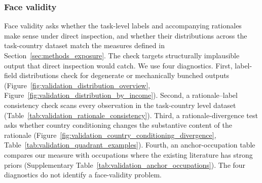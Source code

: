 \documentclass[11pt]{article}
\begin{document}
\subsubsection{Face validity}
\label{sec:validation_face}
Face validity asks whether the task-level labels and accompanying rationales make sense under direct inspection, and whether their distributions across the task-country dataset match the measures defined in Section~\ref{sec:methods_exposure}. The check targets structurally implausible output that direct inspection would catch. We use four diagnostics. First, label-field distributions check for degenerate or mechanically bunched outputs (Figure~\ref{fig:validation_distribution_overview}, Figure~\ref{fig:validation_distribution_by_income}). Second, a rationale--label consistency check scans every observation in the task-country level dataset (Table~\ref{tab:validation_rationale_consistency}). Third, a rationale-divergence test asks whether country conditioning changes the substantive content of the rationale (Figure~\ref{fig:validation_country_conditioning_divergence}, Table~\ref{tab:validation_quadrant_examples}). Fourth, an anchor-occupation table compares our measure with occupations where the existing literature has strong priors (Supplementary Table~\ref{tab:validation_anchor_occupations}). The four diagnostics do not identify a face-validity problem.
\end{document}
